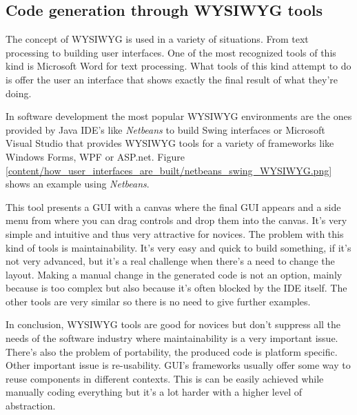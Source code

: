 \subsection{Code generation through WYSIWYG tools}
The concept of WYSIWYG is used in a variety of situations. From text processing to building user interfaces. One of the most recognized tools of this kind is Microsoft Word for text processing. What tools of this kind attempt to do is offer the user an interface that shows exactly the final result of what they're doing.

In software development the most popular WYSIWYG environments are the ones provided by Java IDE's like \textit{Netbeans} to build Swing interfaces or Microsoft Visual Studio that provides WYSIWYG tools for a variety of frameworks like Windows Forms, WPF or ASP.net. Figure \ref{content/how_user_interfaces_are_built/netbeans_swing_WYSIWYG.png} shows an example using \textit{Netbeans}.

This tool presents a GUI with a canvas where the final GUI appears and a side menu from where you can drag controls and drop them into the canvas. It's very simple and intuitive and thus very attractive for novices. The problem with this kind of tools is maintainability. It's very easy and quick to build something, if it's not very advanced, but it's a real challenge when there's a need to change the layout. Making a manual change in the generated code is not an option, mainly because is too complex but also because it's often blocked by the IDE itself. The other tools are very similar so there is no need to give further examples.

In conclusion, WYSIWYG tools are good for novices but don't suppress all the needs of the software industry where maintainability is a very important issue. There's also the problem of portability, the produced code is platform specific. Other important issue is re-usability. GUI's frameworks usually offer some way to reuse components in different contexts. This is can be easily achieved while manually coding everything but it's a lot harder with a higher level of abstraction.